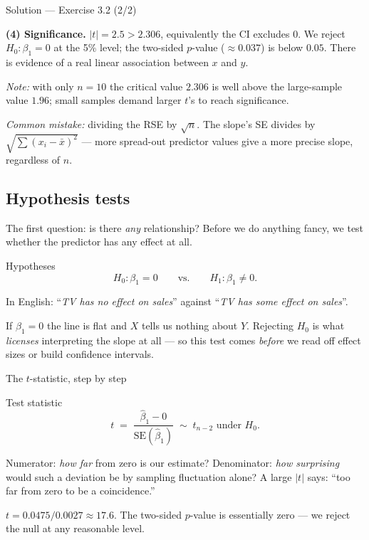 \documentclass[aspectratio=169,11pt]{beamer}
\begin{document}
\begin{frame}{Solution --- Exercise 3.2 (2/2)}
  \begin{solutionbox}
    \textbf{(4) Significance.} $|t|=2.5 > 2.306$, equivalently the CI
    excludes $0$. We reject $H_0:\beta_1=0$ at the 5\% level; the
    two-sided $p$-value ($\approx 0.037$) is below $0.05$. There is
    evidence of a real linear association between $x$ and $y$.

    \medskip
    \textit{Note:} with only $n=10$ the critical value $2.306$ is well
    above the large-sample value $1.96$; small samples demand larger
    $t$'s to reach significance.

    \smallskip
    \textit{Common mistake:} dividing the RSE by $\sqrt n$. The slope's
    SE divides by $\sqrt{\sum(x_i-\bar x)^2}$ --- more spread-out
    predictor values give a more precise slope, regardless of $n$.
  \end{solutionbox}
\end{frame}

\subsection{Hypothesis tests}

\begin{frame}{The first question: is there \emph{any} relationship?}
  Before we do anything fancy, we test whether the predictor has any
  effect at all.
  \begin{block}{Hypotheses}
    \[
      H_0: \beta_1 = 0 \qquad \text{vs.} \qquad H_1: \beta_1 \ne 0.
    \]
  \end{block}
  In English: ``\emph{TV has no effect on sales}'' against
  ``\emph{TV has \emph{some} effect on sales}''.
  \begin{takeaway}
    If $\beta_1=0$ the line is flat and $X$ tells us nothing about $Y$.
    Rejecting $H_0$ is what \emph{licenses} interpreting the slope at all
    --- so this test comes \emph{before} we read off effect sizes or
    build confidence intervals.
  \end{takeaway}
\end{frame}

\begin{frame}{The $t$-statistic, step by step}
  \begin{block}{Test statistic}
    \[
      t \;=\; \frac{\hat\beta_1 - 0}{\mathrm{SE}(\hat\beta_1)}
            \;\sim\; t_{n-2} \text{ under } H_0.
    \]
  \end{block}
  \begin{readme}
    Numerator: \emph{how far} from zero is our estimate?
    Denominator: \emph{how surprising} would such a deviation be by
    sampling fluctuation alone?
    A large $|t|$ says: ``too far from zero to be a coincidence.''
  \end{readme}
  \begin{numexample}
    $t = 0.0475 / 0.0027 \approx 17.6$. The two-sided $p$-value is
    essentially zero --- we reject the null at any reasonable level.
  \end{numexample}
\end{frame}
\end{document}
